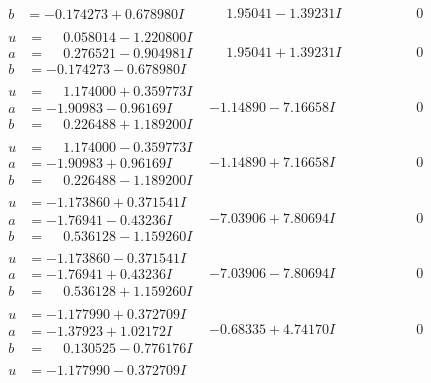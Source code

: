 \documentclass[1p]{elsarticle_modified}
\theoremstyle{definition}
\begin{document}
$$\begin{array}{c|c|c}
\begin{aligned}
b &= -0.174273 + 0.678980 I\end{aligned}
 & \phantom{-}1.95041 - 1.39231 I & \phantom{-0.000000 } 0 \\ \hline\begin{aligned}
u &= \phantom{-}0.058014 - 1.220800 I \\
a &= \phantom{-}0.276521 - 0.904981 I \\
b &= -0.174273 - 0.678980 I\end{aligned}
 & \phantom{-}1.95041 + 1.39231 I & \phantom{-0.000000 } 0 \\ \hline\begin{aligned}
u &= \phantom{-}1.174000 + 0.359773 I \\
a &= -1.90983 - 0.96169 I \\
b &= \phantom{-}0.226488 + 1.189200 I\end{aligned}
 & -1.14890 - 7.16658 I & \phantom{-0.000000 } 0 \\ \hline\begin{aligned}
u &= \phantom{-}1.174000 - 0.359773 I \\
a &= -1.90983 + 0.96169 I \\
b &= \phantom{-}0.226488 - 1.189200 I\end{aligned}
 & -1.14890 + 7.16658 I & \phantom{-0.000000 } 0 \\ \hline\begin{aligned}
u &= -1.173860 + 0.371541 I \\
a &= -1.76941 - 0.43236 I \\
b &= \phantom{-}0.536128 - 1.159260 I\end{aligned}
 & -7.03906 + 7.80694 I & \phantom{-0.000000 } 0 \\ \hline\begin{aligned}
u &= -1.173860 - 0.371541 I \\
a &= -1.76941 + 0.43236 I \\
b &= \phantom{-}0.536128 + 1.159260 I\end{aligned}
 & -7.03906 - 7.80694 I & \phantom{-0.000000 } 0 \\ \hline\begin{aligned}
u &= -1.177990 + 0.372709 I \\
a &= -1.37923 + 1.02172 I \\
b &= \phantom{-}0.130525 - 0.776176 I\end{aligned}
 & -0.68335 + 4.74170 I & \phantom{-0.000000 } 0 \\ \hline\begin{aligned}
u &= -1.177990 - 0.372709 I \\

\end{aligned}
\end{array}$$
\end{document}

